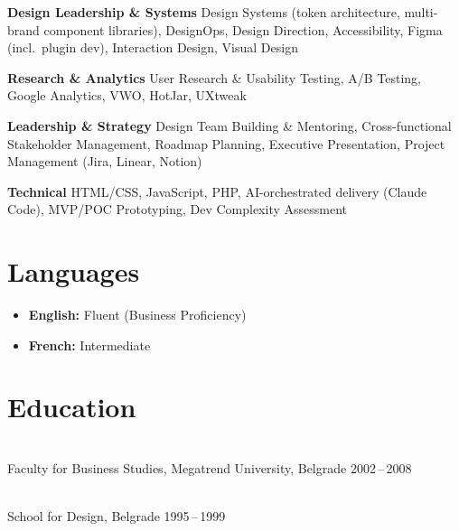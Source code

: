 \documentclass[a4paper,9.5pt]{article}
\newcommand{\skillblock}[2]{%
  {\small\bfseries #1}\newline%
  {\small\color{midgray}#2}%
}
\begin{document}
\vspace{2pt}
\noindent
\begin{minipage}[t]{0.475\textwidth}
  \skillblock{Design Leadership \& Systems}{%
    Design Systems (token architecture,
    multi-brand component libraries),
    DesignOps, Design Direction,
    Accessibility, Figma (incl.\ plugin dev),
    Interaction Design, Visual Design}

  \vspace{12pt}
  \skillblock{Research \& Analytics}{%
    User Research \& Usability Testing,
    A/B Testing, Google Analytics,
    VWO, HotJar, UXtweak}
\end{minipage}%
\hspace{0.05\textwidth}%
\begin{minipage}[t]{0.475\textwidth}
  \skillblock{Leadership \& Strategy}{%
    Design Team Building \& Mentoring,
    Cross-functional Stakeholder Management,
    Roadmap Planning, Executive Presentation,
    Project Management (Jira, Linear, Notion)}

  \vspace{12pt}
  \skillblock{Technical}{%
    HTML/CSS, JavaScript, PHP,
    AI-orchestrated delivery (Claude Code),
    MVP/POC Prototyping,
    Dev Complexity Assessment}
\end{minipage}

\section{Languages}

\begin{itemize}[leftmargin=1.2em, label={•},
    topsep=0pt, itemsep=2pt, parsep=0pt]
  \item {\small\textbf{English:} Fluent (Business Proficiency)}
  \item {\small\textbf{French:} Intermediate}
\end{itemize}

\section{Education}

\\[1pt]
{\small\color{midgray}Faculty for Business Studies,
Megatrend University, Belgrade \hfill 2002\,--\,2008}

\vspace{6pt}

\\[1pt]
{\small\color{midgray}School for Design, Belgrade
\hfill 1995\,--\,1999}
\end{document}
